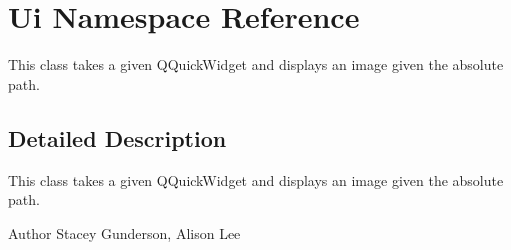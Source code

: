 \hypertarget{namespace_ui}{}\section{Ui Namespace Reference}
\label{namespace_ui}


This class takes a given Q\+Quick\+Widget and displays an image given the absolute path.  




\subsection{Detailed Description}
This class takes a given Q\+Quick\+Widget and displays an image given the absolute path. 

\begin{DoxyAuthor}{Author}
Stacey Gunderson, Alison Lee 
\end{DoxyAuthor}
